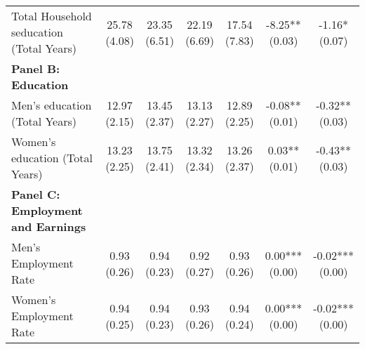 \begin{table}[!h]
{\begin{threeparttable}
\begin{tabular}[t]{lcccccc}
\hspace{1em}Total Household seducation (Total Years) & \specialcell{25.78\\(4.08)} & \specialcell{23.35\\(6.51)} & \specialcell{22.19\\(6.69)} & \specialcell{17.54\\(7.83)} & \specialcell{-8.25**\\(0.03)} & \specialcell{-1.16*\\(0.07)}\\
\textbf{Panel B: Education} & \textbf{} & \textbf{} & \textbf{} & \textbf{} & \textbf{} & \textbf{}\\
\addlinespace
\hspace{1em}Men’s education (Total Years) & \specialcell{12.97\\(2.15)} & \specialcell{13.45\\(2.37)} & \specialcell{13.13\\(2.27)} & \specialcell{12.89\\(2.25)} & \specialcell{-0.08**\\(0.01)} & \specialcell{-0.32**\\(0.03)}\\
\hspace{1em}Women’s education (Total Years) & \specialcell{13.23\\(2.25)} & \specialcell{13.75\\(2.41)} & \specialcell{13.32\\(2.34)} & \specialcell{13.26\\(2.37)} & \specialcell{0.03**\\(0.01)} & \specialcell{-0.43**\\(0.03)}\\
\textbf{Panel C: Employment and Earnings} & \textbf{} & \textbf{} & \textbf{} & \textbf{} & \textbf{} & \textbf{}\\
\hspace{1em}Men’s Employment Rate & \specialcell{0.93\\(0.26)} & \specialcell{0.94\\(0.23)} & \specialcell{0.92\\(0.27)} & \specialcell{0.93\\(0.26)} & \specialcell{0.00***\\(0.00)} & \specialcell{-0.02***\\(0.00)}\\
\hspace{1em}Women’s Employment Rate & \specialcell{0.94\\(0.25)} & \specialcell{0.94\\(0.23)} & \specialcell{0.93\\(0.26)} & \specialcell{0.94\\(0.24)} & \specialcell{0.00***\\(0.00)} & \specialcell{-0.02***\\(0.00)}\\

\end{tabular}
\end{threeparttable}}
\end{table}
